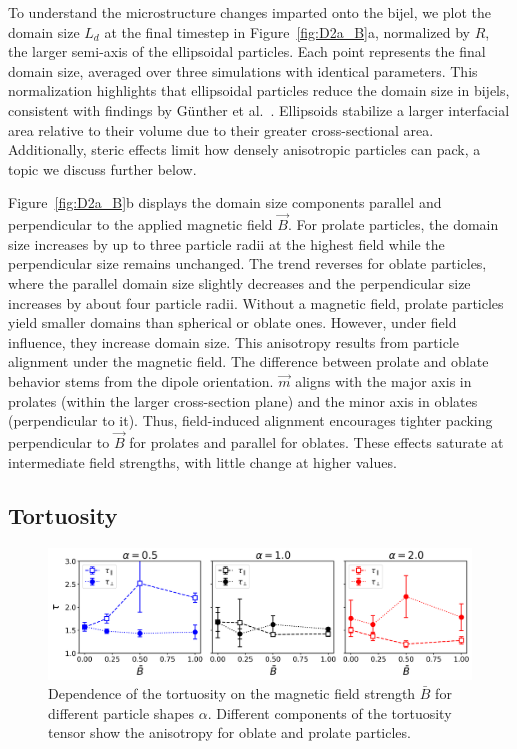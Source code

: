 To understand the microstructure changes imparted onto the bijel, we plot the domain size \(L_d\) at the final timestep in 
Figure~\ref{fig:D2a_B}a, normalized by \(R\), the larger semi-axis of the ellipsoidal particles. Each point 
represents the final domain size, averaged over three simulations with identical parameters. This normalization highlights that ellipsoidal particles 
reduce the domain size in bijels, consistent with findings by Günther et al.~\cite{gunther_timescales_2014}. Ellipsoids stabilize a larger interfacial 
area relative to their volume due to their greater cross-sectional area. Additionally, steric effects limit how densely anisotropic particles can pack, 
a topic we discuss further below.

Figure~\ref{fig:D2a_B}b displays the domain size components parallel and perpendicular to the applied magnetic field \(\vec{B}\). For prolate particles, 
the domain size increases by up to three particle radii at the highest field while the perpendicular size remains unchanged. The 
trend reverses for oblate particles, where the parallel domain size slightly decreases and the perpendicular size increases by about four particle radii.
Without a magnetic field, prolate particles yield smaller domains than spherical or oblate ones. However, under field influence, they increase domain size. 
This anisotropy results from particle alignment under the magnetic field. The difference between prolate and oblate behavior 
stems from the dipole orientation. \(\vec{m}\) aligns with the major axis in prolates (within the larger cross-section plane) and the minor axis in oblates 
(perpendicular to it). Thus, field-induced alignment encourages tighter packing perpendicular to \(\vec{B}\) for prolates and parallel for oblates. These 
effects saturate at intermediate field strengths, with little change at higher values.

    
\subsection{Tortuosity}
    
    \begin{figure}
    \centering
    \includegraphics[width=\textwidth]{../figures/results/paper1/tortuosity_compare.png}
    \caption{Dependence of the tortuosity on the magnetic field strength $\bar{B}$ for different particle shapes $\alpha$. Different components of the tortuosity tensor show the anisotropy for oblate and prolate particles.}
    \label{fig:tau_B}
    \end{figure}

